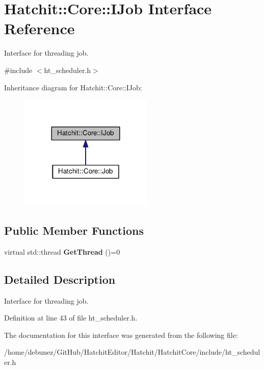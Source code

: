 \hypertarget{classHatchit_1_1Core_1_1IJob}{}\section{Hatchit\+:\+:Core\+:\+:I\+Job Interface Reference}
\label{classHatchit_1_1Core_1_1IJob}


Interface for threading job.  




{\ttfamily \#include $<$ht\+\_\+scheduler.\+h$>$}



Inheritance diagram for Hatchit\+:\+:Core\+:\+:I\+Job\+:
\nopagebreak
\begin{figure}[H]
\begin{center}
\leavevmode
\includegraphics[width=180pt]{classHatchit_1_1Core_1_1IJob__inherit__graph}
\end{center}
\end{figure}
\subsection*{Public Member Functions}
\begin{DoxyCompactItemize}
\item 
virtual std\+::thread {\bfseries Get\+Thread} ()=0\hypertarget{classHatchit_1_1Core_1_1IJob_ad13d0b3a6fc70d275322982e83a021c3}{}\label{classHatchit_1_1Core_1_1IJob_ad13d0b3a6fc70d275322982e83a021c3}

\end{DoxyCompactItemize}


\subsection{Detailed Description}
Interface for threading job. 

Definition at line 43 of file ht\+\_\+scheduler.\+h.



The documentation for this interface was generated from the following file\+:\begin{DoxyCompactItemize}
\item 
/home/debunez/\+Git\+Hub/\+Hatchit\+Editor/\+Hatchit/\+Hatchit\+Core/include/ht\+\_\+scheduler.\+h\end{DoxyCompactItemize}
